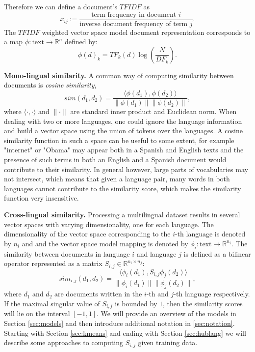 \documentclass[twoside,11pt]{article}
\newcommand{\RR}{\mathbb{R}}
\begin{document}
Therefore we can define a document's $TFIDF$ as
$$ x_{ij}  := \frac{\mbox{term frequency in document } i}{\mbox{inverse document frequency of term } j}.$$
The $TFIDF$ weighted vector space model document representation corresponds to a map $\phi : \text{text} \rightarrow \RR^n$ defined by:
$$\phi(d)_k = {TF}_k(d) \log\left( \frac{N}{{DF}_k}\right).$$

\noindent\textbf {Mono-lingual similarity.}
A common way of computing similarity between documents is \emph{cosine similarity},
$$sim(d_1, d_2) = \frac{\langle \phi(d_1), \phi(d_2)\rangle}{\|\phi(d_1)\| \|\phi(d_2)\|},$$
where $\langle \cdot,\cdot \rangle$ and $\|\cdot\|$ are standard inner product and Euclidean norm. When dealing with two or more languages, one could ignore the language information
and build a vector space using the union of tokens over the languages. A cosine similarity function in such a space can be useful to some extent, for example "internet" or "Obama" may appear both in a Spanish and English texts and the presence of such terms in both an English and a Spanish document would contribute to their similarity. In general however, large parts of vocabularies may not intersect, which means that given a language pair, many words in both languages cannot contribute to the similarity score, which makes the similarity function very insensitive.

\noindent\textbf {Cross-lingual similarity.}
Processing a multilingual dataset results in several vector spaces with varying dimensionality, one for each language. The dimensionality of the vector space corresponding to the $i$-th language is denoted by $n_i$ and and the vector space model mapping is denoted by $\phi_i : \text{text} \rightarrow \RR^{n_i}$.
The similarity between documents in language $i$ and language $j$ is defined as a bilinear operator represented as a matrix $S_{i,j} \in \RR^{n_i \times n_j}$:
$$sim_{i,j}(d_1, d_2) = \frac{ \langle \phi_i (d_1), S_{i,j} \phi_j (d_2) \rangle }{\|\phi_i(d_1)\| \|\phi_j(d_2)\|},$$
where $d_1$ and $d_2$ are documents written in the $i$-th and $j$-th language respectively. If the maximal singular value of $S_{i,j}$ is bounded by $1$, then the similarity scores will lie on the interval $[-1, 1]$. We will provide an overview of the models in Section \ref{sec:models} and then introduce additional notation in \ref{sec:notation}. Starting with Section \ref{sec:kmeans} and ending with Section \ref{sec:hublang} we will describe some approaches to computing $S_{i,j}$ given training data.
\end{document}
